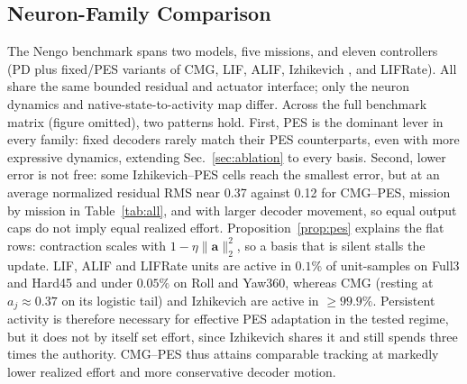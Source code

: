 \documentclass[letterpaper, 10 pt, conference]{ieeeconf}
\begin{document}
\subsection{Neuron-Family Comparison}
\label{sec:family}

The Nengo benchmark spans two models, five missions, and eleven controllers (PD plus fixed/PES variants of CMG, LIF, ALIF, Izhikevich \cite{izhikevich2003}, and LIFRate). All share the same bounded residual and actuator interface; only the neuron dynamics and native-state-to-activity map differ.
Across the full benchmark matrix (figure omitted), two patterns hold. First, PES is the
dominant lever in every family: fixed decoders rarely match their PES
counterparts, even with more expressive dynamics, extending
Sec.~\ref{sec:ablation} to every basis. Second, lower error is not free:
some Izhikevich--PES cells reach the smallest error, but at an average
normalized residual RMS near 0.37 against 0.12 for CMG--PES, mission by mission in
Table~\ref{tab:all}, and with larger decoder movement, so equal output caps do not
imply equal realized effort.
Proposition~\ref{prop:pes} explains the flat rows: contraction scales with $1-\eta\|\bm a\|_2^2$, so a basis that is silent stalls the update. LIF, ALIF and LIFRate units are active in $0.1\%$ of unit-samples on Full3 and Hard45 and under $0.05\%$ on Roll and Yaw360, whereas CMG (resting at $a_j\approx0.37$ on its logistic tail) and Izhikevich are active in ${\ge}99.9\%$. Persistent activity is therefore necessary for effective PES adaptation in the tested regime, but it does not by itself set effort, since Izhikevich shares it and still spends three times the authority. CMG--PES thus attains comparable tracking at markedly lower realized effort and
more conservative decoder motion.


\end{document}
